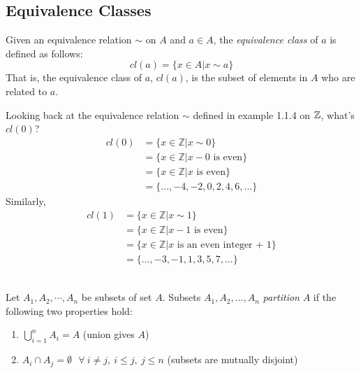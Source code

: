 \subsection{Equivalence Classes}
\begin{definition}
Given an equivalence relation $\sim$  on $A$ and $a\in A$, the \textit{equivalence class} of $a$ is defined as follows:
\begin{equation}
    cl(a)=\{x\in A | x \sim a\} \nonumber
\end{equation}
That is, the equivalence class of $a$, $cl(a)$, is the subset of elements in $A$ who are related to $a$.
\end{definition}
\noindent Looking back at the equivalence relation $\sim$ defined in example 1.1.4 on ${\mathbb{ Z}}$, what's $cl(0)$?\\
\begin{align}
    cl(0)&= \{x\in \mathbb{Z}| x\sim 0\} \nonumber\\
    &= \{x\in \mathbb{Z}| x-0 \text{ is even}\}\nonumber\\
    &= \{x\in \mathbb{Z}| x \text{ is even}\}\nonumber\\
    &= \{...,-4,-2,0,2,4,6, ...\}\nonumber
\end{align}
Similarly,
\begin{align}
    cl(1)&= \{x\in \mathbb{Z}| x\sim 1\} \nonumber\\
    &= \{x\in \mathbb{Z}| x-1 \text{ is even}\}\nonumber\\
    &= \{x\in \mathbb{Z}| x \text{ is an even integer + 1}\}\nonumber\\
    &= \{...,-3,-1,1,3,5,7, ...\}\nonumber
\end{align} \\
\newpage
\begin{definition}[Partition]
Let $A_1, A_2, \cdots , A_n$ be subsets of set $A$. Subsets $A_1, A_2, ..., A_n$ \textit{partition} $A$ if the following two properties hold:
\begin{enumerate}[label=(\roman*)]
    \item $\bigcup_{i=1}^n A_i=A$ (union gives $A$)
    \item $A_i\cap A_j = \emptyset \ \ \ \forall\  i\neq j, \ i\leq j, \ j\leq n$ (subsets are mutually disjoint)
\end{enumerate}
\end{definition}
